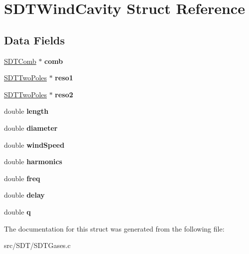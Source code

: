 \hypertarget{struct_s_d_t_wind_cavity}{}\section{S\+D\+T\+Wind\+Cavity Struct Reference}
\label{struct_s_d_t_wind_cavity}
\subsection*{Data Fields}
\begin{DoxyCompactItemize}
\item 
\hypertarget{struct_s_d_t_wind_cavity_a3143e32d1614f7c8f823acc9a6de5e8f}{}\hyperlink{struct_s_d_t_comb}{S\+D\+T\+Comb} $\ast$ {\bfseries comb}\label{struct_s_d_t_wind_cavity_a3143e32d1614f7c8f823acc9a6de5e8f}

\item 
\hypertarget{struct_s_d_t_wind_cavity_a094609f6a6e339abd0a546926d0c5d87}{}\hyperlink{struct_s_d_t_two_poles}{S\+D\+T\+Two\+Poles} $\ast$ {\bfseries reso1}\label{struct_s_d_t_wind_cavity_a094609f6a6e339abd0a546926d0c5d87}

\item 
\hypertarget{struct_s_d_t_wind_cavity_a96c0f0a576271b9d306b5c452fdc7133}{}\hyperlink{struct_s_d_t_two_poles}{S\+D\+T\+Two\+Poles} $\ast$ {\bfseries reso2}\label{struct_s_d_t_wind_cavity_a96c0f0a576271b9d306b5c452fdc7133}

\item 
\hypertarget{struct_s_d_t_wind_cavity_a928b11f5716331f0b89abe7d8d4124b4}{}double {\bfseries length}\label{struct_s_d_t_wind_cavity_a928b11f5716331f0b89abe7d8d4124b4}

\item 
\hypertarget{struct_s_d_t_wind_cavity_a2242a375bebbd1a1d1cf02a80d2715a2}{}double {\bfseries diameter}\label{struct_s_d_t_wind_cavity_a2242a375bebbd1a1d1cf02a80d2715a2}

\item 
\hypertarget{struct_s_d_t_wind_cavity_a1e61109612ce4b40408c03d7d23405c5}{}double {\bfseries wind\+Speed}\label{struct_s_d_t_wind_cavity_a1e61109612ce4b40408c03d7d23405c5}

\item 
\hypertarget{struct_s_d_t_wind_cavity_a9fd082ae353e2c5a3efd31e440c12e89}{}double {\bfseries harmonics}\label{struct_s_d_t_wind_cavity_a9fd082ae353e2c5a3efd31e440c12e89}

\item 
\hypertarget{struct_s_d_t_wind_cavity_a26aea75a25190af8d4bebf654888935d}{}double {\bfseries freq}\label{struct_s_d_t_wind_cavity_a26aea75a25190af8d4bebf654888935d}

\item 
\hypertarget{struct_s_d_t_wind_cavity_a0bf98c9ae4eac6da250cb1e2fac20365}{}double {\bfseries delay}\label{struct_s_d_t_wind_cavity_a0bf98c9ae4eac6da250cb1e2fac20365}

\item 
\hypertarget{struct_s_d_t_wind_cavity_a5b5e3f03e443adea974601f295136638}{}double {\bfseries q}\label{struct_s_d_t_wind_cavity_a5b5e3f03e443adea974601f295136638}

\end{DoxyCompactItemize}


The documentation for this struct was generated from the following file\+:\begin{DoxyCompactItemize}
\item 
src/\+S\+D\+T/S\+D\+T\+Gases.\+c\end{DoxyCompactItemize}

